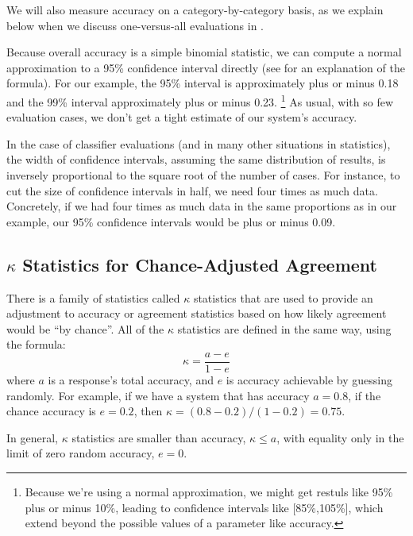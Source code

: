 We will also measure accuracy on a category-by-category basis, as we
explain below when we discuss one-versus-all evaluations in
.

Because overall accuracy is a simple binomial statistic, we can
compute a normal approximation to a 95\% confidence interval directly
(see  for an explanation of the
formula).  For our example, the 95\% interval is approximately plus or
minus 0.18 and the 99\% interval approximately plus or minus 0.23.%
%
\footnote{Because we're using a normal approximation, we might get
  restuls like 95\% plus or minus 10\%, leading to confidence
  intervals like [85\%,105\%], which extend beyond the possible values
  of a parameter like accuracy.}
%
As usual, with so few evaluation cases, we don't get a tight estimate
of our system's accuracy.

In the case of classifier evaluations (and in many other situations in
statistics), the width of confidence intervals, assuming the same
distribution of results, is inversely proportional to the square root
of the number of cases.  For instance, to cut the size of confidence
intervals in half, we need four times as much data.  Concretely, if we
had four times as much data in the same proportions as in our example,
our 95\% confidence intervals would be plus or minus 0.09.  


\subsection{$\kappa$ Statistics for Chance-Adjusted Agreement}\label{section:classifier-eval-kappa}

There is a family of statistics called $\kappa$ statistics that are
used to provide an adjustment to accuracy or agreement statistics
based on how likely agreement would be ``by chance''.  All of
the $\kappa$ statistics are defined in the same way, using the
formula:
%
\begin{equation}\label{eq:kappa-statistic}
\kappa = \frac{a - e}{1 - e}
\end{equation}
%
where $a$ is a response's total accuracy, and $e$ is accuracy
achievable by guessing randomly.  For example, if we have a system
that has accuracy $a = 0.8$, if the chance accuracy is $e=0.2$, then
$\kappa = (0.8 - 0.2)/(1 - 0.2) = 0.75$.  

In general, $\kappa$ statistics are smaller than accuracy, $\kappa
\leq a$, with equality only in the limit of zero random accuracy,
$e=0$.

